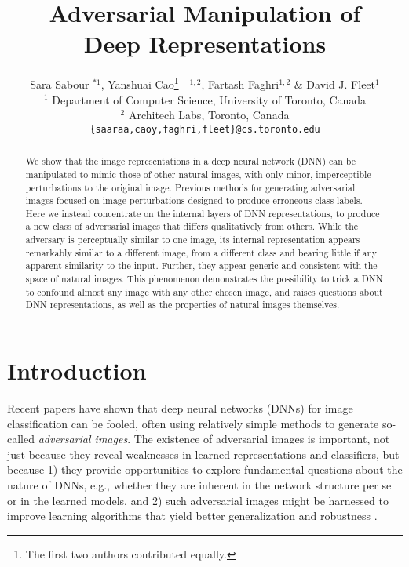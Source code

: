 \documentclass{article} %
\title{Adversarial Manipulation of \\Deep Representations}
\author{
    Sara Sabour $^{* 1}$, Yanshuai Cao\thanks{The first two authors contributed
    equally.}~~$^{1,2}$, Fartash Faghri$^{1,2}$ \& David J.  Fleet$^1$\\
    $^1$ Department of Computer Science,
    University of Toronto, Canada\\
    $^2$ Architech Labs, Toronto, Canada\\
    \texttt{\{saaraa,caoy,faghri,fleet\}@cs.toronto.edu}    }
\begin{document}
\maketitle

\begin{abstract}
\vspace*{-0.1cm}
We show that the image representations in a deep neural network
(DNN) can be manipulated to mimic those of other natural images,
with only minor, imperceptible perturbations to the original image.
Previous methods for generating adversarial images focused on image
perturbations designed to produce erroneous class labels.  Here we
instead concentrate on the internal layers of DNN representations,
to produce a new class of adversarial images that differs qualitatively
from others. While the adversary is perceptually similar to one image,
its internal representation appears remarkably similar to a different
image, from a different class and bearing little if any apparent
similarity to the input.  Further, they appear generic and consistent
with the space of natural images.  This phenomenon demonstrates the
possibility to trick a DNN to confound almost any image with any other
chosen image, and raises questions about DNN representations, as well
as the properties of natural images themselves.

\vspace*{-0.1cm}
\end{abstract}

\section{Introduction}\vspace*{-0.1cm}%

Recent papers have shown that deep neural networks (DNNs) for image
classification can be fooled, often using relatively simple methods to
generate so-called {\em adversarial images}\citep{FawziEtalICLR2015, GoodfellowEtalICLR2015, GuRigazioNIPSWorkshop2014,
NguyenEtAlCVPR2015, SzegedyElatICLR2014, Tabacof2015exploring}.
The existence of adversarial images is important, not
just because they reveal weaknesses in learned representations
and classifiers, but because 1) they provide opportunities to explore
fundamental questions about the nature of DNNs, e.g., whether they are
inherent in the network structure per se or in the learned models, and
2) such adversarial images might be harnessed to improve learning
algorithms that yield better generalization and robustness
\citep{GoodfellowEtalICLR2015, GuRigazioNIPSWorkshop2014}.
\end{document}
